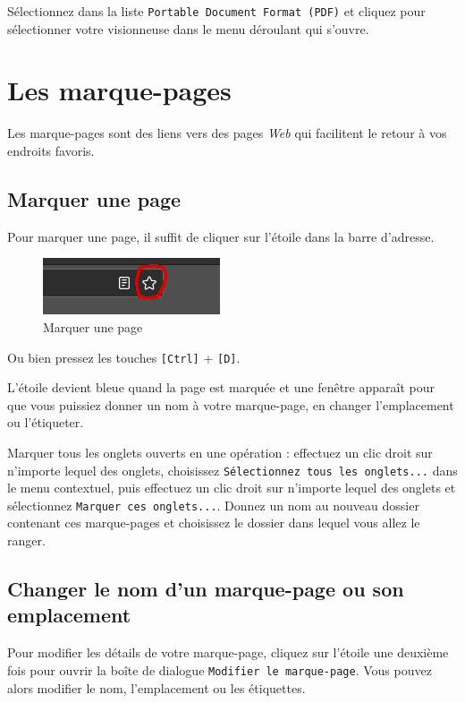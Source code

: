 \documentclass[a4paper,11pt]{book}
\begin{document}
Sélectionnez dans la liste \texttt{Portable Document Format (PDF)} et cliquez pour sélectionner votre visionneuse dans le menu déroulant qui s'ouvre.
\medskip

\section{Les marque-pages}
Les marque-pages sont des liens vers des pages \textit{Web} qui facilitent le retour à vos endroits favoris.
\medskip

\subsection*{Marquer une page}
Pour marquer une page, il suffit de cliquer sur l’étoile dans la barre d’adresse. 
\begin{figure}[!h]
\begin{center}
\includegraphics[scale=0.5]{IMG/007--Marque_page.png}
\caption{Marquer une page}
\end{center}
\end{figure}
\medskip

Ou bien pressez les touches \texttt{[Ctrl]} + \texttt{[D]}.
\medskip

L’étoile devient bleue quand la page est marquée et une fenêtre apparaît pour que vous puissiez donner un nom à votre marque-page, en changer l’emplacement ou l’étiqueter. 
\medskip

Marquer tous les onglets ouverts en une opération : effectuez un clic droit sur n’importe lequel des onglets, choisissez \texttt{Sélectionnez tous les onglets...} dans le menu contextuel, puis effectuez un clic droit sur n’importe lequel des onglets et sélectionnez \texttt{Marquer ces onglets...}. Donnez un nom au nouveau dossier contenant ces marque-pages et choisissez le dossier dans lequel vous allez le ranger.
\medskip

\subsection*{Changer le nom d’un marque-page ou son emplacement}
Pour modifier les détails de votre marque-page, cliquez sur l’étoile une deuxième fois pour ouvrir la boîte de dialogue \texttt{Modifier le marque-page}. Vous pouvez alors modifier le nom, l'emplacement ou les étiquettes.
\medskip
\end{document}
